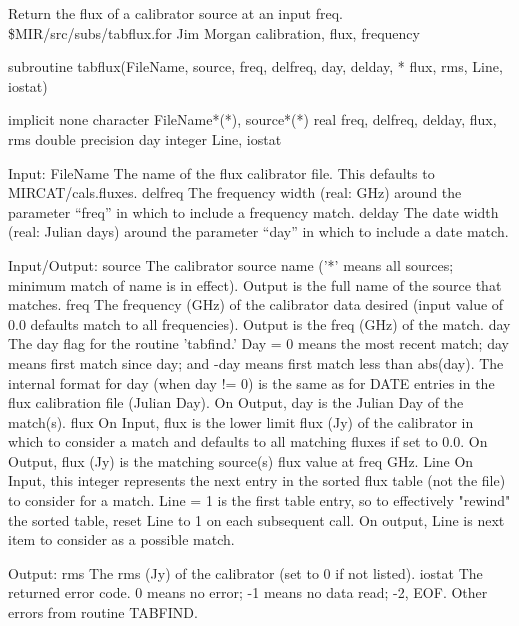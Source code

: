 %
\noindent Return the flux of a calibrator source at an input freq.
\newline \ 
\newline {} \$MIR/src/subs/tabflux.for
\newline {} Jim Morgan
\newline {} calibration, flux, frequency
\par{\tenpoint
{\eightpoint\begintt
      subroutine tabflux(FileName, source, freq, delfreq, day, delday,
     *  flux, rms, Line, iostat)

      implicit none
      character FileName*(*), source*(*)
      real freq, delfreq, delday, flux, rms
      double precision day
      integer Line, iostat

 Input:
   FileName The name of the flux calibrator file.  This defaults to
            MIRCAT/cals.fluxes.
   delfreq  The frequency width (real: GHz) around the parameter
            ``freq'' in which to include a frequency match.
   delday   The date width (real: Julian days) around the parameter
            ``day'' in which to include a date match.

 Input/Output:
   source   The calibrator source name ('*' means all sources;
            minimum match of name is in effect).
            Output is the full name of the source that matches.
   freq     The frequency (GHz) of the calibrator data desired (input
            value of 0.0 defaults match to all frequencies).  Output
            is the freq (GHz) of the match.
   day      The day flag for the routine 'tabfind.' Day = 0 means the
            most recent match; day means first match since day; and -day
            means first match less than abs(day).  The internal format
            for day (when day != 0) is the same as for DATE entries in
            the flux calibration file (Julian Day).  On Output, day
            is the Julian Day of the match(s).
   flux     On Input, flux is the lower limit flux (Jy) of the calibrator
            in which to consider a match and defaults to all matching
            fluxes if set to 0.0.  On Output, flux (Jy) is the matching
            source(s) flux value at freq GHz.
   Line     On Input, this integer represents the next entry in the
            sorted flux table (not the file) to consider for a match.
            Line = 1 is the first table entry, so to effectively "rewind"
            the sorted table, reset Line to 1 on each subsequent call.
            On output, Line is next item to consider as a possible match.

 Output:
   rms      The rms (Jy) of the calibrator (set to 0 if not listed).
   iostat   The returned error code.  0 means no error; -1 means no
            data read; -2, EOF.  Other errors from routine TABFIND.
\endtt}
\par}

